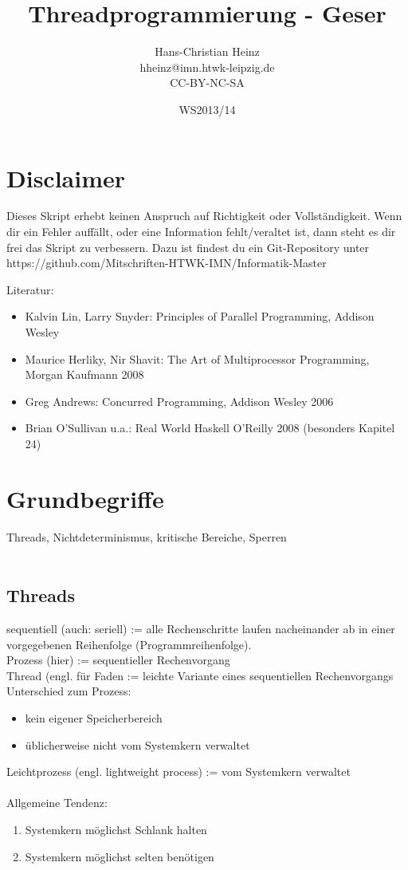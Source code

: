 \documentclass[a4paper,12pt]{scrartcl}
\title{Threadprogrammierung - Geser}
\author{Hans-Christian Heinz\\
hheinz@imn.htwk-leipzig.de\\
CC-BY-NC-SA}
\date{WS2013/14}
\begin{document}
\maketitle

\section*{Disclaimer}
Dieses Skript erhebt keinen Anspruch auf Richtigkeit oder Vollständigkeit. 
Wenn dir ein Fehler auffällt, oder eine Information fehlt/veraltet ist,
dann steht es dir frei das Skript zu verbessern. 
Dazu ist findest du ein Git-Repository unter 
https://github.com/Mitschriften-HTWK-IMN/Informatik-Master

Literatur:
\begin{itemize}
 \item Kalvin Lin, Larry Snyder: Principles of Parallel Programming, Addison Wesley
 \item Maurice Herliky, Nir Shavit: The Art of Multiprocessor Programming, Morgan Kaufmann 2008
 \item Greg Andrews: Concurred Programming, Addison Wesley 2006
 \item Brian O'Sullivan u.a.: Real World Haskell O'Reilly 2008 (besonders Kapitel 24)
\end{itemize}

\section{Grundbegriffe}
Threads, Nichtdeterminismus, kritische Bereiche, Sperren\\
\\
\subsection{Threads}
sequentiell (auch: seriell) := alle Rechenschritte laufen nacheinander ab in einer vorgegebenen Reihenfolge (\glqq{}Programmreihenfolge\grqq{}).\\
Prozess (hier) := sequentieller Rechenvorgang\\
Thread (engl. für \glqq{}Faden\grqq{} := leichte Variante eines sequentiellen Rechenvorgangs\\
Unterschied zum Prozess:
\begin{itemize}
 \item kein eigener Speicherbereich
 \item üblicherweise nicht vom Systemkern verwaltet
\end{itemize}
Leichtprozess (engl. lightweight process) := vom Systemkern verwaltet
\\
\\
Allgemeine Tendenz:
\begin{enumerate}
 \item Systemkern möglichst Schlank halten
 \item Systemkern möglichst selten benötigen
\end{enumerate}
\end{document}
